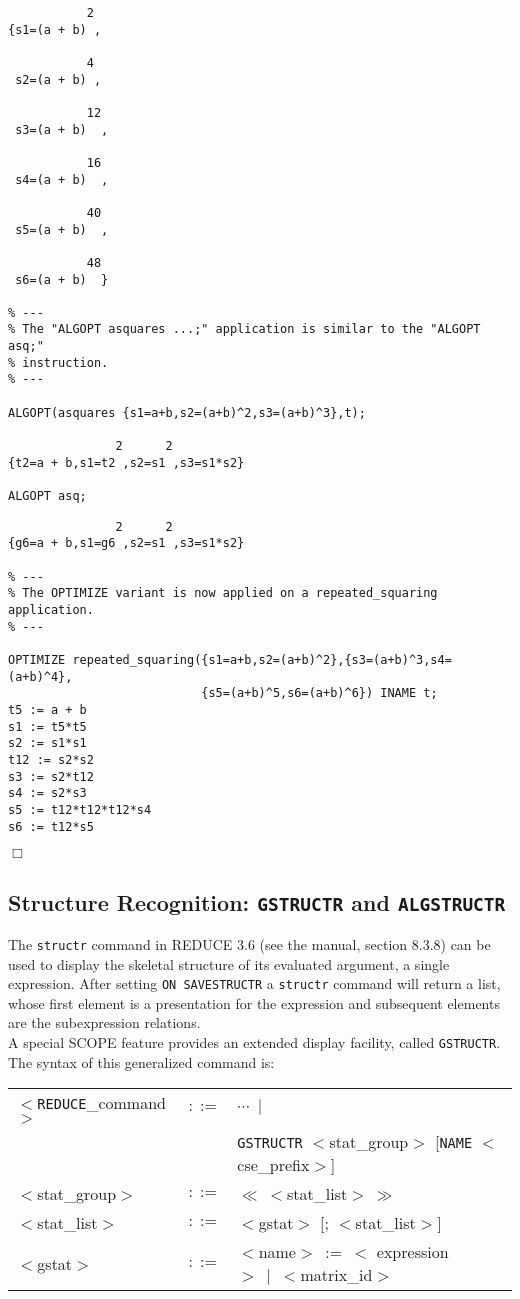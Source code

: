 {\begin{verbatim}
           2
{s1=(a + b) ,

           4
 s2=(a + b) ,

           12
 s3=(a + b)  ,

           16
 s4=(a + b)  ,

           40
 s5=(a + b)  ,

           48
 s6=(a + b)  }

% ---
% The "ALGOPT asquares ...;" application is similar to the "ALGOPT asq;"
% instruction.
% ---

ALGOPT(asquares {s1=a+b,s2=(a+b)^2,s3=(a+b)^3},t);

               2      2
{t2=a + b,s1=t2 ,s2=s1 ,s3=s1*s2}

ALGOPT asq;
\end{verbatim}}
\newpage
{\small
\begin{verbatim}
               2      2
{g6=a + b,s1=g6 ,s2=s1 ,s3=s1*s2}

% ---
% The OPTIMIZE variant is now applied on a repeated_squaring application.
% ---

OPTIMIZE repeated_squaring({s1=a+b,s2=(a+b)^2},{s3=(a+b)^3,s4=(a+b)^4},
                           {s5=(a+b)^5,s6=(a+b)^6}) INAME t;
t5 := a + b
s1 := t5*t5
s2 := s1*s1
t12 := s2*s2
s3 := s2*t12
s4 := s2*s3
s5 := t12*t12*t12*s4
s6 := t12*s5
\end{verbatim}
\begin{flushright}
$\Box$
\end{flushright}}

\subsection{Structure Recognition:
{\tt GSTRUCTR} and {\tt ALGSTRUCTR}} \label{SSF:sr}

The {\tt structr} command in REDUCE 3.6 (see the manual, section 8.3.8)
can be used
to display the skeletal structure of its evaluated argument, a single
expression. After setting {\tt ON SAVESTRUCTR} a {\tt structr} command
will return a list, whose first element is a presentation for the expression
and subsequent elements are the subexpression relations.\\
A special SCOPE feature provides an extended display facility, called
{\tt GSTRUCTR}. The syntax of this generalized command is:

\begin{center}
\begin{tabular}{lcl}
$<${\tt REDUCE}\_command$>$ & $::=$ & $\cdots~\mid$\\
& & {\tt GSTRUCTR} $<$stat\_group$>$ [{\tt NAME} $<$cse\_prefix$>$]\\
$<$stat\_group$>$ & $::=$ & $\ll~<$stat\_list$>~\gg$\\
$<$stat\_list$>$ & $::=$ & $<$gstat$>$ [; $<$stat\_list$>$]\\
$<$gstat$>$ & $::=$ & $<$name$>~:=~<$ expression$>~\mid~<$matrix\_id$>$
\end{tabular}
\end{center}

